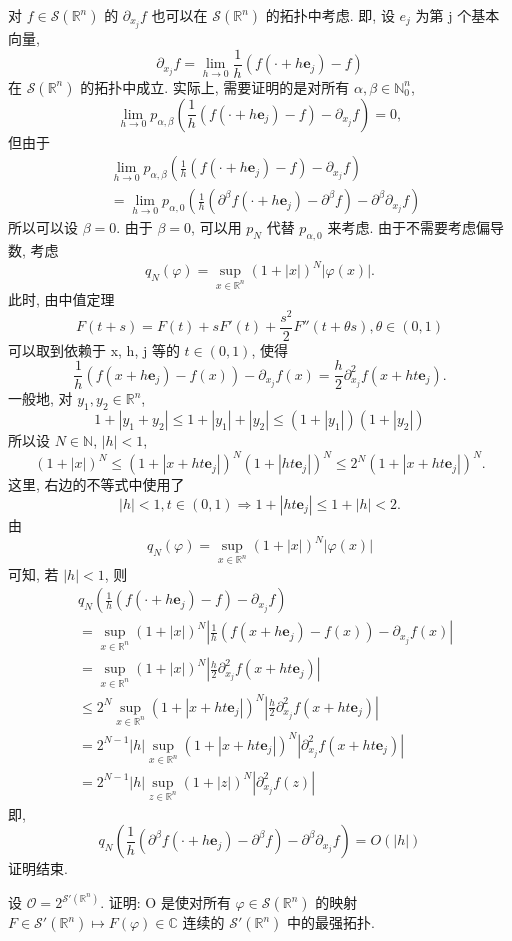 \begin{example}\label{exa:5.10}
对 $f \in \mathcal{S}(\mathbb{R}^{n})$ 的 $\partial_{x_{j}}f$ 也可以在 $\mathcal{S}(\mathbb{R}^{n})$ 的拓扑中考虑. 即, 设 $e_{j}$ 为第 j 个基本向量,
\[
\partial_{x_{j}}f = \lim_{h \to 0}\frac{1}{h}(f(\cdot + h\mathbf{e}_{j}) - f)
\]
在 $\mathcal{S}(\mathbb{R}^{n})$ 的拓扑中成立. 实际上, 需要证明的是对所有 $\alpha, \beta \in \mathbb{N}_{0}^{n}$,
\[
\lim_{h \to 0}p_{\alpha,\beta}\left(\frac{1}{h}(f(\cdot + h\mathbf{e}_{j}) - f) - \partial_{x_{j}}f\right) = 0,
\]
但由于
\begin{align*}
&\lim_{h \to 0}p_{\alpha,\beta}\left(\frac{1}{h}(f(\cdot + h\mathbf{e}_{j}) - f) - \partial_{x_{j}}f\right) \\
&= \lim_{h \to 0}p_{\alpha,0}\left(\frac{1}{h}(\partial^{\beta}f(\cdot + h\mathbf{e}_{j}) - \partial^{\beta}f) - \partial^{\beta}\partial_{x_{j}}f\right)
\end{align*}
所以可以设 $\beta = 0$. 由于 $\beta = 0$, 可以用 $p_{N}$ 代替 $p_{\alpha,0}$ 来考虑. 由于不需要考虑偏导数, 考虑
\[
q_{N}(\varphi) = \sup_{x \in \mathbb{R}^{n}}(1+|x|)^{N}|\varphi(x)|.
\]
此时, 由中值定理
\[
F(t+s) = F(t) + sF'(t) + \frac{s^{2}}{2}F''(t+\theta s), \theta \in (0, 1)
\]
可以取到依赖于 x, h, j 等的 $t \in (0, 1)$, 使得
\[
\frac{1}{h}(f(x + h\mathbf{e}_{j}) - f(x)) - \partial_{x_{j}}f(x) = \frac{h}{2}\partial_{x_{j}}^{2}f(x + ht\mathbf{e}_{j}).
\]
一般地, 对 $y_{1}, y_{2} \in \mathbb{R}^{n}$,
\[
1 + |y_{1} + y_{2}| \leq 1 + |y_{1}| + |y_{2}| \leq (1+|y_{1}|)(1+|y_{2}|)
\]
所以设 $N \in \mathbb{N}$, $|h| < 1$,
\[
(1+|x|)^{N} \leq (1+|x + ht\mathbf{e}_{j}|)^{N}(1+|ht\mathbf{e}_{j}|)^{N} \leq 2^{N}(1+|x + ht\mathbf{e}_{j}|)^{N}.
\]
这里, 右边的不等式中使用了
\[
|h| < 1, t \in (0, 1) \Longrightarrow 1 + |ht\mathbf{e}_{j}| \leq 1 + |h| < 2.
\]
由
\[
q_{N}(\varphi) = \sup_{x \in \mathbb{R}^{n}}(1+|x|)^{N}|\varphi(x)|
\]
可知, 若 $|h| < 1$, 则
\begin{align*}
&q_{N}\left(\frac{1}{h}(f(\cdot + h\mathbf{e}_{j}) - f) - \partial_{x_{j}}f\right) \\
&= \sup_{x \in \mathbb{R}^{n}}(1+|x|)^{N}\left|\frac{1}{h}(f(x + h\mathbf{e}_{j}) - f(x)) - \partial_{x_{j}}f(x)\right| \\
&= \sup_{x \in \mathbb{R}^{n}}(1+|x|)^{N}\left|\frac{h}{2}\partial_{x_{j}}^{2}f(x + ht\mathbf{e}_{j})\right| \\
&\leq 2^{N}\sup_{x \in \mathbb{R}^{n}}(1+|x + ht\mathbf{e}_{j}|)^{N}\left|\frac{h}{2}\partial_{x_{j}}^{2}f(x + ht\mathbf{e}_{j})\right| \\
&= 2^{N-1}|h|\sup_{x \in \mathbb{R}^{n}}(1+|x + ht\mathbf{e}_{j}|)^{N}|\partial_{x_{j}}^{2}f(x + ht\mathbf{e}_{j})| \\
&= 2^{N-1}|h|\sup_{z \in \mathbb{R}^{n}}(1+|z|)^{N}|\partial_{x_{j}}^{2}f(z)|
\end{align*}
即,
\[
q_{N}\left(\frac{1}{h}(\partial^{\beta}f(\cdot + h\mathbf{e}_{j}) - \partial^{\beta}f) - \partial^{\beta}\partial_{x_{j}}f\right) = O(|h|)
\]
证明结束.
\end{example}

\begin{exercise}\label{exer:5.6}
设 $\mathcal{O} = 2^{\mathcal{S}'(\mathbb{R}^{n})}$. 证明: O 是使对所有 $\varphi \in \mathcal{S}(\mathbb{R}^{n})$ 的映射 $F \in \mathcal{S}'(\mathbb{R}^{n}) \mapsto F(\varphi) \in \mathbb{C}$ 连续的 $\mathcal{S}'(\mathbb{R}^{n})$ 中的最强拓扑.
\end{exercise}
